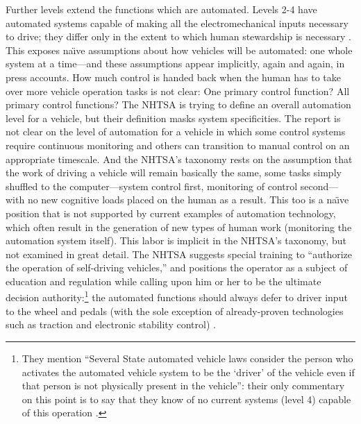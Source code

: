 Further levels extend the functions which are automated. Levels 2-4
have automated systems capable of making all the electromechanical
inputs necessary to drive; they differ only in the extent to which
human stewardship is necessary \cite[p. 4--5]{NHTSA}. This exposes na\"{\i}ve assumptions about
how vehicles will be automated:  one whole system at a time---and
these assumptions appear implicitly, again and again, in press
accounts. How much
control is handed back when the human has to take over more vehicle
operation tasks is not clear: One primary control function? All
primary control functions? The NHTSA is trying to define an overall
automation level for a vehicle, but their definition masks system
specificities. The report is not clear on the level of automation for
a vehicle in which some control systems require continuous monitoring
and others can transition to manual control on an appropriate
timescale. And the NHTSA's taxonomy rests on the assumption that the
work of driving a vehicle will remain basically the same, some tasks
simply shuffled to the computer---system control first, monitoring of
control second---with no new cognitive loads placed on the human as a
result. This too is a na\"{\i}ve position that is not supported by current
examples of automation technology, which often result in the
generation of new types of human work (monitoring the
automation system itself). This labor is implicit in the NHTSA's
taxonomy, but not examined in great detail. The NHTSA suggests special
training to ``authorize the operation of self-driving
vehicles,'' \cite[p. 11]{NHTSA} and
positions the operator as a subject of education and regulation while
calling upon him or her to be the ultimate decision
authority:\footnote{They mention ``Several State automated vehicle laws
consider the person who activates the automated vehicle system to be
the `driver' of the vehicle even if that person is not physically
present in the vehicle'': their only commentary on this point is to say
that they know of no current systems (level 4) capable of this
operation \cite[p. 5]{NHTSA}.} the
automated functions should always defer to driver input to the wheel
and pedals (with the sole exception of already-proven technologies
such as traction and electronic stability control) \cite[p. 13]{NHTSA}.

